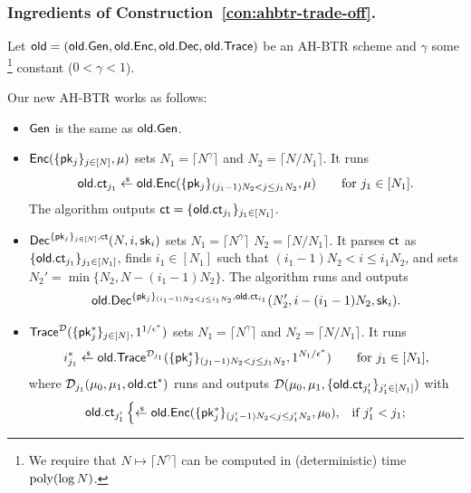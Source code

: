 \subsubsection{Ingredients of Construction~\ref{con:ahbtr-trade-off}.}
Let ${\OLD=(\OLD.\Gen,\OLD.\Enc,\OLD.\Dec,\OLD.\Trace)}$ be an AH-BTR scheme and
$\gamma$ some%
\footnote{We require that ${N\mapsto\lceil N^\gamma\rceil}$ can be computed in (deterministic) time $\operatorname{poly}(\log N)$.}
constant (${0<\gamma<1}$).

\begin{construction}\label{con:ahbtr-trade-off}
Our new AH-BTR works as follows:
\begin{itemize}
\item $\Gen$ is the same as $\OLD.\Gen$.
\item $\Enc(\{\pk_j\}_{j\in[N]},\mu)$ sets
${N_1=\lceil N^\gamma\rceil}$ and
${N_2=\lceil N/N_1\rceil}$.
It runs
\begin{align*}
\OLD.\ct_{j_1}\draws\OLD.\Enc(\{\pk_j\}_{(j_1-1)N_2<j\leq j_1N_2},\mu)
\qquad\textup{for }j_1\in[N_1].
\end{align*}
The algorithm outputs ${\ct=\{\OLD.\ct_{j_1}\}_{j_1\in[N_1]}}$.
\item $\Dec^{\{\pk_j\}_{j\in[N]},\ct}(N,i,\sk_i)$ sets
${N_1=\lceil N^\gamma\rceil}$
${N_2=\lceil N/N_1\rceil}$.
It parses $\ct$ as $\{\OLD.\ct_{j_1}\}_{j_1\in[N_1]}$,
finds ${i_1\in[N_1]}$ such that ${(i_1-1)N_2<i\leq i_1N_2}$, and
sets ${N_2'=\min{\{N_2,N-(i_1-1)N_2\}}}$.
The algorithm runs and outputs
\begin{align*}
\OLD.\Dec^{\{\pk_j\}_{(i_1-1)N_2<j\leq i_1N_2},\OLD.\ct_{i_1}}
(N_2',i-(i_1-1)N_2,\sk_i).
\end{align*}
\item $\Trace^\scriptD(\{\pk^\ast_j\}_{j\in[N]},1^{1/\epsilon^\ast})$ sets
${N_1=\lceil N^\gamma\rceil}$ and
${N_2=\lceil N/N_1\rceil}$.
It runs
\begin{align*}
i^\ast_{j_1}\draws\OLD.\Trace^{\scriptD_{j_1}}(\{\pk^\ast_j\}_{(j_1-1)N_2<j\leq j_1N_2},1^{N_1/\epsilon^\ast})
\qquad\textup{for }j_1\in[N_1],
\end{align*}
where
$\scriptD_{j_1}(\mu_0,\mu_1,\OLD.\ct^\ast)$
runs and outputs
$\scriptD(\mu_0,\mu_1,\{\OLD.\ct_{j_1'}\}_{j_1'\in[N_1]})$
with
\begin{align*}
\OLD.\ct_{j_1'}\begin{cases}
\draws\OLD.\Enc(\{\pk^\ast_j\}_{(j_1'-1)N_2<j\leq j_1'N_2},\mu_0),&
\textup{if }j_1'<j_1;\\

\end{cases}
\end{align*}
\end{itemize}
\end{construction}
